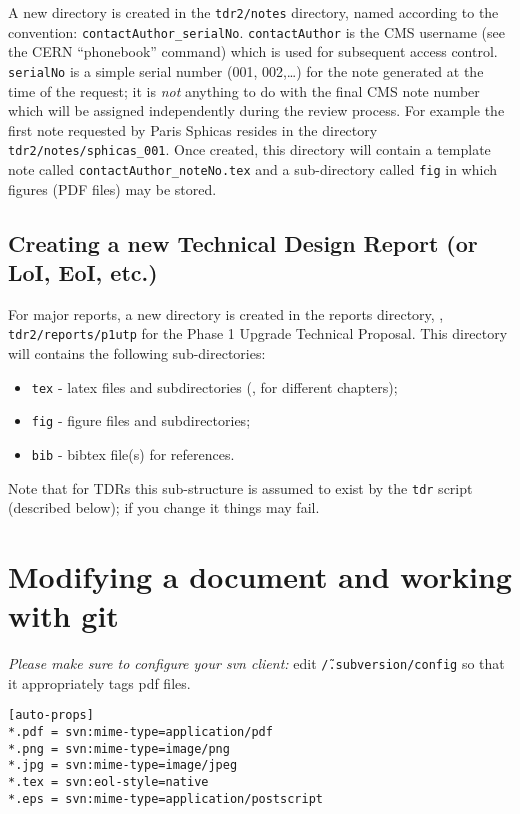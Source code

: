 A new directory is created in the \texttt{tdr2/notes} directory, named according to
the convention: \texttt{contactAuthor\_serialNo}.
\texttt{contactAuthor} is the CMS username (see the CERN ``phonebook'' command)
which is used for subsequent access control.
\texttt{serialNo} is a simple serial number (001, 002,\ldots) for the note
generated at the time of the request; it is \emph{not} anything to do with the
final CMS note number which will be assigned independently during the review process.
For example the first note requested by Paris Sphicas resides in
the directory \texttt{tdr2/notes/sphicas\_001}.
Once created, this directory will contain a template note
called \texttt{contactAuthor\_noteNo.tex} and a sub-directory
called \texttt{fig} in which figures (PDF files) may be stored.

\subsection{Creating a new Technical Design Report (or LoI, EoI, etc.)}

For major reports, a new directory is created in the reports directory, \eg, \texttt{tdr2/reports/p1utp}
for the Phase 1 Upgrade Technical Proposal.
This directory will contains the following sub-directories:
\begin{itemize}
  \item \texttt{tex}   - latex files and subdirectories (\eg, for different chapters);
  \item \texttt{fig}   - figure files and subdirectories;
  \item \texttt{bib}   - bibtex file(s) for references.
\end{itemize}
%
Note that for TDRs this sub-structure is assumed to exist by the \texttt{tdr}
script (described below); if you change it things may fail.



\clearpage
\section{Modifying a document and working with git\label{edit}}



\emph{Please make sure to configure your svn client:} edit \texttt{\~/.subversion/config} so that it appropriately tags pdf files.
\begin{verbatim}
[auto-props]
*.pdf = svn:mime-type=application/pdf
*.png = svn:mime-type=image/png
*.jpg = svn:mime-type=image/jpeg
*.tex = svn:eol-style=native
*.eps = svn:mime-type=application/postscript
\end{verbatim}


